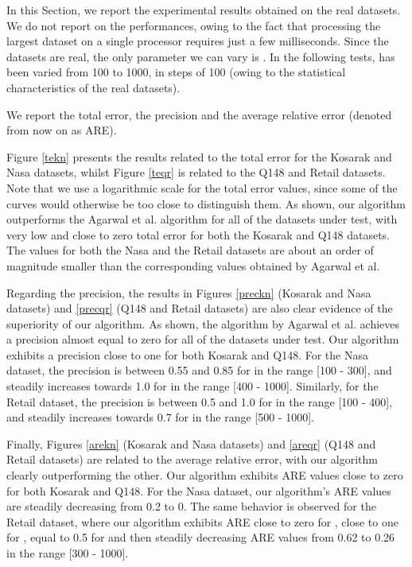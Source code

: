 \documentclass[final,3p,times]{elsarticle}
\begin{document}
In this Section, we report the experimental results obtained on the real datasets. We do not report on the performances, owing to the fact that processing the largest dataset on a single processor requires just a few milliseconds. Since the datasets are real, the only parameter we can vary is . In the following tests,  has been varied from 100 to 1000, in steps of 100 (owing to the statistical characteristics of the real datasets). 

We report the total error, the precision and the average relative error (denoted from now on as ARE). 

Figure \ref{tekn} presents the results related to the total error for the Kosarak and Nasa datasets, whilst Figure \ref{teqr} is related to the Q148 and Retail datasets. Note that we use a logarithmic scale for the total error values, since some of the curves would otherwise be too close to distinguish them. As shown, our algorithm outperforms the Agarwal et al. algorithm for all of the datasets under test, with very low and close to zero total error for both the Kosarak and Q148 datasets. The values for both the Nasa and the Retail datasets are about an order of magnitude smaller than the corresponding values obtained by Agarwal et al. 

Regarding the precision, the results in Figures \ref{preckn} (Kosarak and Nasa datasets) and \ref{precqr} (Q148 and Retail datasets) are also clear evidence of the superiority of our algorithm. As shown, the algorithm by Agarwal et al. achieves a precision almost equal to zero for all of the datasets under test. Our algorithm exhibits a precision close to one for both Kosarak and Q148. For the Nasa dataset, the precision is between 0.55 and 0.85 for  in the range [100 - 300], and steadily increases towards 1.0 for  in the range [400 - 1000]. Similarly, for the Retail dataset, the precision is between 0.5 and 1.0 for  in the range [100 - 400], and steadily increases towards 0.7 for  in the range [500 - 1000].

Finally, Figures \ref{arekn} (Kosarak and Nasa datasets) and \ref{areqr} (Q148 and Retail datasets) are related to the average relative error, with our algorithm clearly outperforming the other. Our algorithm exhibits ARE values close to zero for both Kosarak and Q148. For the Nasa dataset, our algorithm's ARE values are steadily decreasing from 0.2 to 0. The same behavior is observed for the Retail dataset, where our algorithm exhibits ARE close to zero for , close to one for , equal to 0.5 for  and then steadily decreasing ARE values from 0.62 to 0.26 in the range [300 - 1000].
\end{document}
